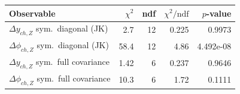 \begin{tabular}{|l|r|r|r|r|}
\hline
Observable & $\chi^2$ & ndf & $\chi^2/\mathrm{ndf}$ & $p$-value \\
\hline
$\Delta y_{ch,Z}$ sym.\ diagonal (JK) & 2.7 & 12 & 0.225 & 0.9973 \\
$\Delta\phi_{ch,Z}$ sym.\ diagonal (JK) & 58.4 & 12 & 4.86 & 4.492e-08 \\
$\Delta y_{ch,Z}$ sym.\ full covariance & 1.42 & 6 & 0.237 & 0.9646 \\
$\Delta\phi_{ch,Z}$ sym.\ full covariance & 10.3 & 6 & 1.72 & 0.1111 \\
\hline
\end{tabular}
